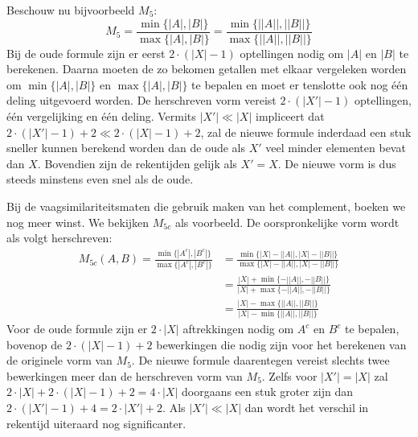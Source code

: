 Beschouw nu bijvoorbeeld $M_{5}$:
\begin{displaymath}
M_{5} = \frac{\min\{|A|,|B|\}}{\max\{|A|,|B|\}} = \frac{\min\{||A||,||B||\}}{\max\{||A||,||B||\}}
\end{displaymath}
Bij de oude formule zijn er eerst $2 \cdot (|X|-1)$ optellingen nodig
om $|A|$ en $|B|$ te berekenen. Daarna moeten de zo bekomen getallen met elkaar vergeleken worden
om $\min\{|A|,|B|\}$ en $\max\{|A|,|B|\}$ te bepalen en moet er tenslotte ook nog \'e\'en deling
uitgevoerd worden. De herschreven vorm vereist $ 2 \cdot (|X'|-1)$ optellingen, \'e\'en vergelijking
en \'e\'en deling. Vermits $|X'| \ll |X|$ impliceert 
dat $2 \cdot (|X'|-1) + 2 \ll 2 \cdot (|X|-1) + 2$, zal de nieuwe formule inderdaad een stuk sneller kunnen 
berekend worden dan de oude als $X'$ veel minder elementen bevat dan $X$. Bovendien zijn de rekentijden
gelijk als $X'=X$. De nieuwe vorm is dus steeds minstens even snel als de oude.

Bij de vaagsimilariteitsmaten die gebruik maken van het complement, boeken we nog meer winst.
We bekijken $M_{5c}$ als voorbeeld. De oorspronkelijke vorm wordt als volgt herschreven:
\begin{align*}
\displaystyle M_{5c}(A,B) = \displaystyle \frac{\min \{|A^c|,|B^c|\}}{\max \{|A^c|,|B^c|\}} 
& = \displaystyle \frac{\min \{|X|-||A||,|X|-||B||\}}{\max \{|X|-||A||,|X|-||B||\}} \\
& = \displaystyle \frac{|X| + \min \{-||A||,-||B||\}}{|X| + \max \{-||A||,-||B||\}} \\
& = \displaystyle \frac{|X| - \max \{||A||,||B||\}}{|X| - \min \{||A||,||B||\}}
\end{align*}
Voor de oude formule zijn er $2\cdot |X|$ aftrekkingen nodig om $A^c$ en $B^c$ te bepalen,
bovenop de $2 \cdot (|X|-1) + 2$ bewerkingen die nodig zijn voor het berekenen van 
de originele vorm van $M_5$. De nieuwe formule daarentegen vereist slechts twee bewerkingen
meer dan de herschreven vorm van $M_5$. Zelfs voor $|X'| = |X|$ zal 
$2 \cdot |X| + 2 \cdot (|X|-1) + 2 = 4 \cdot |X|$ doorgaans een stuk groter zijn dan
$2 \cdot (|X'|-1) + 4 = 2 \cdot |X'| + 2$. Als $|X'| \ll |X|$ dan wordt het verschil in rekentijd
uiteraard nog significanter.